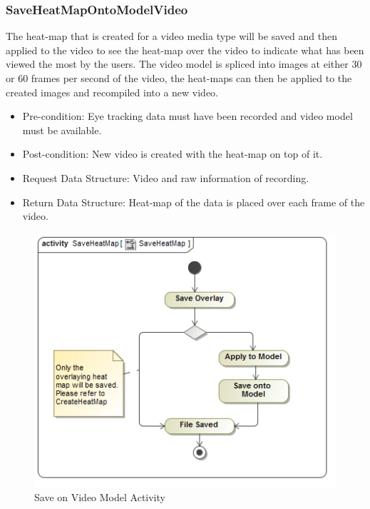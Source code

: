 	\subsubsection{SaveHeatMapOntoModelVideo}
	The heat-map that is created for a video media type will be saved and then applied to the video to see the heat-map over the video to indicate what has been viewed the most by the users. The video model is spliced into images at either 30 or 60 frames per second of the video, the heat-maps can then be applied to the created images and recompiled into a new video.
	\begin{itemize}
		\item Pre-condition: Eye tracking data must have been recorded and video model must be available.
		\item Post-condition: New video is created with the heat-map on top of it.
		\item Request Data Structure: Video and raw information of recording.
		\item Return Data Structure: Heat-map of the data is placed over each frame of the video.
	\end{itemize}
	\begin{figure}[!ht]
		\centering	
		\includegraphics[scale=0.5,width=15cm,keepaspectratio]{Diagrams/Activity_Diagram__SaveHeatMap__SaveHeatMap.png}	
		\caption{Save on Video Model Activity}
	\end{figure}

